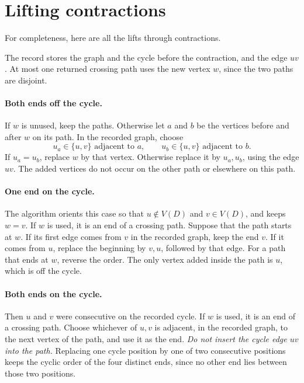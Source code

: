 \documentclass[11pt]{article}
\begin{document}
\section{Lifting contractions}\label{sec:lift}

For completeness, here are all the lifts through contractions.

The record stores the graph and the cycle before the contraction, and the edge
$uv$. At most one returned crossing path uses the new vertex $w$, since the
two paths are disjoint.

\paragraph{Both ends off the cycle.}
If $w$ is unused, keep the paths. Otherwise let $a$ and $b$ be the vertices
before and after $w$ on its path. In the recorded graph, choose
\begin{equation*}
u_a\in\{u,v\}\text{ adjacent to }a,
\qquad
u_b\in\{u,v\}\text{ adjacent to }b.
\end{equation*}
If $u_a=u_b$, replace $w$ by that vertex. Otherwise replace it by $u_a,u_b$,
using the edge $uv$. The added vertices do not occur on the other path or
elsewhere on this path.

\paragraph{One end on the cycle.}
The algorithm orients this case so that $u\notin V(D)$ and $v\in V(D)$, and
keeps $w=v$. If $w$ is used, it is an end of a crossing path. Suppose that the
path starts at $w$. If its first edge comes from $v$ in the recorded graph,
keep the end $v$. If it comes from $u$, replace the beginning by $v,u$,
followed by that edge. For a path that ends at $w$, reverse the order. The only
vertex added inside the path is $u$, which is off the cycle.

\paragraph{Both ends on the cycle.}
Then $u$ and $v$ were consecutive on the recorded cycle. If $w$ is used, it is
an end of a crossing path. Choose whichever of $u,v$ is adjacent, in the
recorded graph, to the next vertex of the path, and use it as the end.
\emph{Do not insert the cycle edge $uv$ into the path.} Replacing one cycle
position by one of two consecutive positions keeps the cyclic order of the
four distinct ends, since no other end lies between those two positions.
\end{document}
